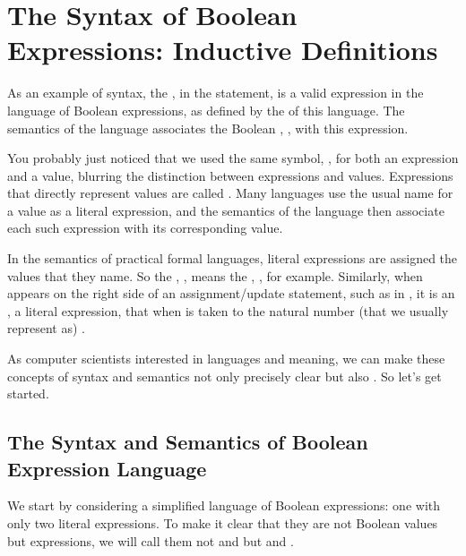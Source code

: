 \documentclass[letterpaper,10pt,english]{sphinxmanual}
\begin{document}
\section{The Syntax of Boolean Expressions: Inductive Definitions}
\label{\detokenize{07-boolean-algebra:the-syntax-of-boolean-expressions-inductive-definitions}}
As an example of syntax, the , in the statement,  is a valid expression in the language of Boolean expressions,
as defined by the  of this language. The semantics of the
language associates the Boolean , , with this expression.

You probably just noticed that we used the same symbol, , for
both an expression and a value, blurring the distinction between
expressions and values. Expressions that directly represent values are
called . Many languages use the usual name for a
value as a literal expression, and the semantics of the language then
associate each such expression with its corresponding value.

In the semantics of practical formal languages, literal expressions
are assigned the values that they name. So the , ,
means the , , for example. Similarly, when  appears on
the right side of an assignment/update statement, such as in ,
it is an , a literal expression, that when  is
taken to  the natural number (that we usually represent as) .

As computer scientists interested in languages and meaning, we can
make these concepts of syntax and semantics not only precisely clear
but also . So let’s get started.


\subsection{The Syntax and Semantics of  Boolean Expression Language}
\label{\detokenize{07-boolean-algebra:the-syntax-and-semantics-of-simplified-boolean-expression-language}}
We start by considering a simplified language of Boolean expressions:
one with only two literal expressions.  To make it clear that they are
not Boolean values but expressions, we will call them not  and
 but  and .
\end{document}
